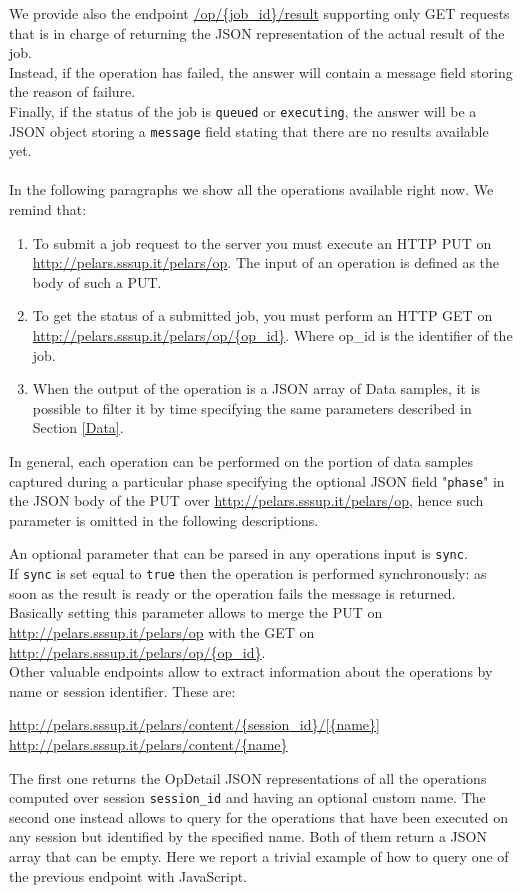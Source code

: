 \documentclass[a4paper,notitlepage,onecolumn]{hitec}  %
\begin{document}
We provide also the endpoint \url{/op/{job\_id}/result} supporting only GET requests that is in charge of returning the JSON representation of the actual result of the job.\\
Instead, if the operation has failed, the answer will contain a message field storing the reason of failure.\\ Finally, if the status of the job is {\tt queued} or {\tt executing}, the answer will be a JSON object storing a {\tt message} field stating that there are no results available yet.\\ \\
In the following paragraphs we show all the operations available right now. We remind that:

\begin{enumerate}
\item To submit a job request to the server you must execute an HTTP PUT on \url{http://pelars.sssup.it/pelars/op}. The input of an operation is defined as the body of such a PUT.
\item To get the status of a submitted job, you must perform an HTTP GET on \url{http://pelars.sssup.it/pelars/op/{op\_id}}. Where op\_id is the identifier of the job.
\item When the output of the operation is a JSON array of Data samples, it is possible to filter it by time specifying the same parameters described in Section \ref{Data}.
\end{enumerate}
In general, each operation can be performed on the portion of data samples captured during a particular phase specifying the optional JSON field "{\tt phase}" in the JSON body of the PUT over \url{http://pelars.sssup.it/pelars/op}, hence such parameter is omitted in the following descriptions.

An optional parameter that can be parsed in any operations input is {\tt sync}.\\ If {\tt sync} is set equal to {\tt true} then the operation is performed synchronously:  as soon as the result is ready or the operation fails the message is returned. Basically setting this parameter allows to merge the PUT on \url{http://pelars.sssup.it/pelars/op} with the GET on \url{http://pelars.sssup.it/pelars/op/{op\_id}}.	\\

Other valuable endpoints allow to extract information about the operations by name or session identifier. These are:
\begin{center}
\url{http://pelars.sssup.it/pelars/content/{session_id}/[{name}]}
\url{http://pelars.sssup.it/pelars/content/{name}}
\end{center}
The first one returns the OpDetail JSON representations of all the operations computed over session {\tt session\_id} and having an optional custom name. The second one instead allows to query for the operations that have been executed on any session but identified by the specified name. Both of them return a JSON array that can be empty. 
Here we report a trivial example of how to query one of the previous endpoint with JavaScript.
\end{document}
